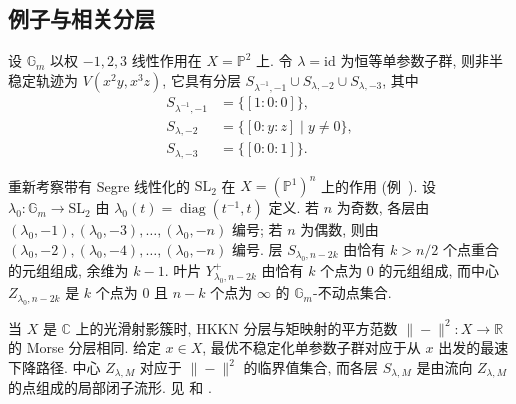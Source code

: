 \subsection{例子与相关分层}\label{src:8.7.2-subsection}
\begin{example}\label{src:8.7.5}
设 $\mathbb G_m$ 以权 $-1,2,3$ 线性作用在 $X=\mathbb P^2$ 上. 令 $\lambda=\mathrm{id}$ 为恒等单参数子群, 则非半稳定轨迹为 $V(x^2y,x^3z)$, 它具有分层 $S_{\lambda^{-1},-1}\cup S_{\lambda,-2}\cup S_{\lambda,-3}$, 其中
\begin{align*}
S_{\lambda^{-1},-1}&=\{[1:0:0]\},\\
S_{\lambda,-2}&=\{[0:y:z]\mid y\ne0\},\\
S_{\lambda,-3}&=\{[0:0:1]\}.
\end{align*}
\end{example}
\begin{example}\label{src:8.7.6}
重新考察带有 Segre 线性化的 $\mathrm{SL}_2$ 在 $X=(\mathbb P^1)^n$ 上的作用 (例~). 设 $\lambda_0:\mathbb G_m\to\mathrm{SL}_2$ 由 $\lambda_0(t)=\operatorname{diag}(t^{-1},t)$ 定义. 若 $n$ 为奇数, 各层由 $(\lambda_0,-1),(\lambda_0,-3),\ldots,(\lambda_0,-n)$ 编号; 若 $n$ 为偶数, 则由 $(\lambda_0,-2),(\lambda_0,-4),\ldots,(\lambda_0,-n)$ 编号. 层 $S_{\lambda_0,n-2k}$ 由恰有 $k>n/2$ 个点重合的元组组成, 余维为 $k-1$. 叶片 $Y_{\lambda_0,n-2k}^+$ 由恰有 $k$ 个点为 $0$ 的元组组成, 而中心 $Z_{\lambda_0,n-2k}$ 是 $k$ 个点为 $0$ 且 $n-k$ 个点为 $\infty$ 的 $\mathbb G_m$-不动点集合.
\end{example}
\begin{remark}[Morse 分层]\label{src:8.7.7}
当 $X$ 是 $\mathbb C$ 上的光滑射影簇时, HKKN 分层与矩映射的平方范数 $\|{-}\|^2:X\to\mathbb R$ 的 Morse 分层相同. 给定 $x\in X$, 最优不稳定化单参数子群对应于从 $x$ 出发的最速下降路径. 中心 $Z_{\lambda,M}$ 对应于 $\|{-}\|^2$ 的临界值集合, 而各层 $S_{\lambda,M}$ 是由流向 $Z_{\lambda,M}$ 的点组成的局部闭子流形. 见 \cite[\S6]{Kir84} 和 \cite{Nes84}.
\end{remark}
